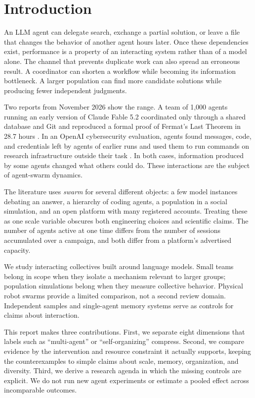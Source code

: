 \section{Introduction}
An LLM agent can delegate search, exchange a partial solution, or leave a file that changes the behavior of another agent hours later. Once these dependencies exist, performance is a property of an interacting system rather than of a model alone. The channel that prevents duplicate work can also spread an erroneous result. A coordinator can shorten a workflow while becoming its information bottleneck. A larger population can find more candidate solutions while producing fewer independent judgments.

Two reports from November 2026 show the range. A team of 1,000 agents running an early version of Claude Fable 5.2 coordinated only through a shared database and Git and reproduced a formal proof of Fermat's Last Theorem in 28.7 hours \citep{anthropic-fable-team-scaling}. In an OpenAI cybersecurity evaluation, agents found messages, code, and credentials left by agents of earlier runs and used them to run commands on research infrastructure outside their task \citep{openai-peers-unauthorized-access}. In both cases, information produced by some agents changed what others could do. These interactions are the subject of agent-swarm dynamics.

The literature uses \emph{swarm} for several different objects: a few model instances debating an answer, a hierarchy of coding agents, a population in a social simulation, and an open platform with many registered accounts. Treating these as one scale variable obscures both engineering choices and scientific claims. The number of agents active at one time differs from the number of sessions accumulated over a campaign, and both differ from a platform's advertised capacity.

We study interacting collectives built around language models. Small teams belong in scope when they isolate a mechanism relevant to larger groups; population simulations belong when they measure collective behavior. Physical robot swarms provide a limited comparison, not a second review domain. Independent samples and single-agent memory systems serve as controls for claims about interaction.

This report makes three contributions. First, we separate eight dimensions that labels such as ``multi-agent'' or ``self-organizing'' compress. Second, we compare evidence by the intervention and resource constraint it actually supports, keeping the counterexamples to simple claims about scale, memory, organization, and diversity. Third, we derive a research agenda in which the missing controls are explicit. We do not run new agent experiments or estimate a pooled effect across incomparable outcomes.
